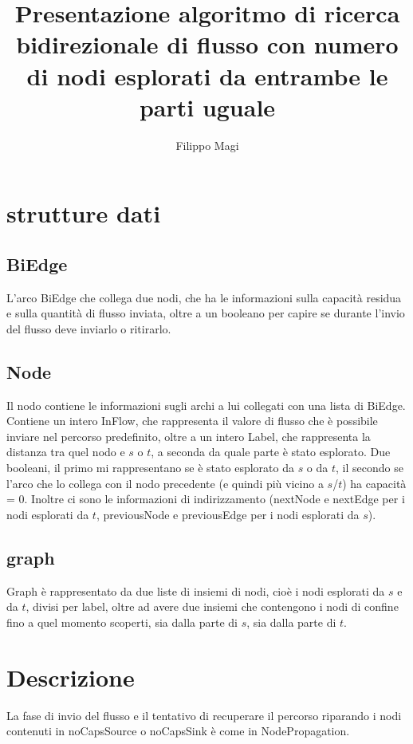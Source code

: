 \documentclass{article}
\title{Presentazione algoritmo di ricerca bidirezionale di flusso con numero di nodi esplorati da entrambe le parti uguale}
\author{Filippo Magi }
\begin{document}
\maketitle

\section{strutture dati}
\subsection{BiEdge}

L'arco BiEdge che collega due nodi, che ha le informazioni sulla capacità residua e sulla quantità di flusso inviata, oltre a un booleano per capire se durante l'invio del flusso deve inviarlo o ritirarlo.

\subsection{Node}

Il nodo contiene le informazioni sugli archi a lui collegati con una lista di BiEdge.
Contiene un intero InFlow, che rappresenta il valore di flusso che è possibile inviare nel percorso predefinito, oltre a un intero Label, che rappresenta la distanza tra quel nodo e $s$ o $t$, a seconda da quale parte è stato esplorato.
Due booleani, il primo mi rappresentano se è stato esplorato da $s$ o da $t$, il secondo se l'arco che lo collega con il nodo precedente (e quindi più vicino a $s$/$t$) ha capacità =  0.
Inoltre ci sono le informazioni di indirizzamento (nextNode e nextEdge per i nodi esplorati da $t$, previousNode e previousEdge per i nodi esplorati da $s$).
\subsection{graph}
Graph è rappresentato da due liste di insiemi di nodi, cioè i nodi esplorati da $s$ e da $t$, divisi per label, oltre ad avere due insiemi che contengono i nodi di confine fino a quel momento scoperti, sia dalla parte di $s$, sia dalla parte di $t$.

\section{Descrizione}

La fase di invio del flusso e il tentativo di recuperare il percorso riparando i nodi contenuti in noCapsSource o noCapsSink è come in NodePropagation. %
\end{document}
